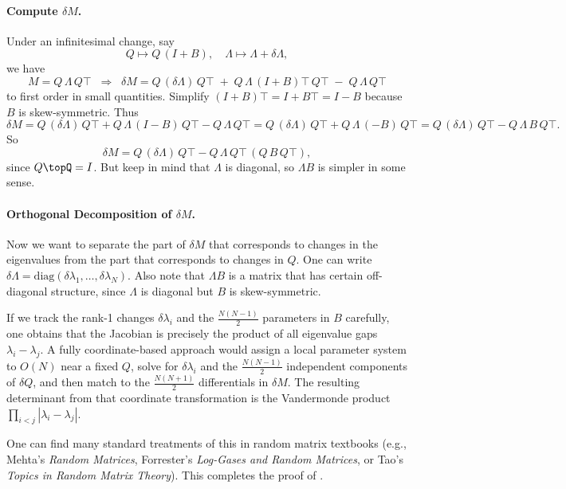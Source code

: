 \documentclass[letterpaper,11pt,oneside,reqno]{article}
\numberwithin{equation}{section}
\theoremstyle{definition}
\begin{document}
\paragraph{Compute \(\delta M\).}
Under an infinitesimal change, say
\[
  Q \mapsto Q\,(I + B),
  \quad
  \Lambda \mapsto \Lambda + \delta\Lambda,
\]
we have
\[
  M
  = Q\,\Lambda\,Q\top
  \;\;\Longrightarrow\;\;
  \delta M
  = Q\,(\delta \Lambda)\,Q\top
   \;+\;
    Q\,\Lambda\,(I+B)\top\,Q\top
   \;-\;
    Q\,\Lambda\,Q\top
\]
to first order in small quantities. Simplify \((I+B)\top = I + B\top = I - B\) because \(B\) is skew-symmetric. Thus
\[
  \delta M
  = Q\,(\delta\Lambda)\,Q\top
   + Q\,\Lambda\,(I - B)\,Q\top
   - Q\,\Lambda\,Q\top
  = Q\,(\delta\Lambda)\,Q\top
    + Q\,\Lambda\,(-B)\,Q\top
  = Q\,(\delta\Lambda)\,Q\top
    - Q\,\Lambda\,B\,Q\top.
\]
So
\[
  \delta M
  = Q\,(\delta\Lambda)\,Q\top
    - Q\,\Lambda\,Q\top \,(Q\,B\,Q\top),
\]
since \(Q\topQ=I\).  But keep in mind that \(\Lambda\) is diagonal, so \(\Lambda B\) is simpler in some sense.

\paragraph{Orthogonal Decomposition of \(\delta M\).}
Now we want to separate the part of \(\delta M\) that corresponds to changes in the eigenvalues from the part that corresponds to changes in \(Q\). One can write \(\delta\Lambda = \mathrm{diag}(\delta\lambda_1,\dots,\delta\lambda_N)\). Also note that \(\Lambda B\) is a matrix that has certain off-diagonal structure, since \(\Lambda\) is diagonal but \(B\) is skew-symmetric.

If we track the rank-1 changes \(\delta\lambda_i\) and the \(\tfrac{N(N-1)}{2}\) parameters in \(B\) carefully, one obtains that the Jacobian is precisely the product of all eigenvalue gaps \(\lambda_i-\lambda_j\). A fully coordinate-based approach would assign a local parameter system to \(O(N)\) near a fixed \(Q\), solve for \(\delta\lambda_i\) and the \(\tfrac{N(N-1)}{2}\) independent components of \(\delta Q\), and then match to the \(\tfrac{N(N+1)}{2}\) differentials in \(\delta M\). The resulting determinant from that coordinate transformation is the Vandermonde product
\(\prod_{i<j}|\lambda_i-\lambda_j|\).

One can find many standard treatments of this in random matrix textbooks (e.g., Mehta’s \emph{Random Matrices}, Forrester’s \emph{Log-Gases and Random Matrices}, or Tao’s \emph{Topics in Random Matrix Theory}). This completes the proof of .
\end{document}
